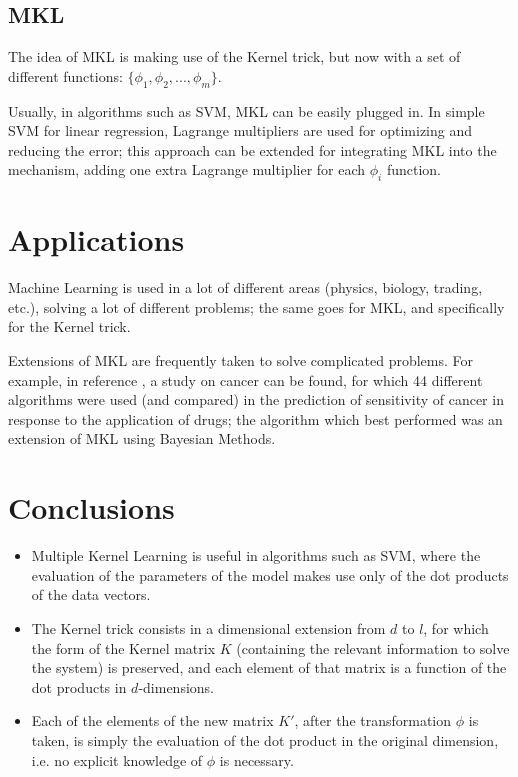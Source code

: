 \documentclass[paper=a4, fontsize=11pt]{scrartcl} %
\numberwithin{equation}{section} %
\numberwithin{figure}{section} %
\numberwithin{table}{section} %
\begin{document}
\subsection{MKL}

The idea of MKL is making use of the Kernel trick, but now with a set of different functions: $\{ \phi_{1}, \phi_{2}, ..., \phi_{m} \}$.

Usually, in algorithms such as SVM, MKL can be easily plugged in. In simple SVM for linear regression, Lagrange multipliers are used for optimizing and reducing the error; this approach can be extended for integrating MKL into the mechanism, adding one extra Lagrange multiplier for each $\phi_{i}$ function.






 



\section{Applications}

Machine Learning is used in a lot of different areas (physics, biology, trading, etc.), solving a lot of different problems; the same goes for MKL, and specifically for the Kernel trick.

Extensions of MKL are frequently taken to solve complicated problems. For example, in reference \cite{cancer_research}, a study on cancer can be found, for which 44 different algorithms were used (and compared) in the prediction of sensitivity of cancer in response to the application of drugs; the algorithm which best performed was an extension of MKL using Bayesian Methods.




\section{Conclusions}

\begin{itemize}
\item Multiple Kernel Learning is useful in algorithms such as SVM, where the evaluation of the parameters of the model makes use only of the dot products of the data vectors.
\item The Kernel trick consists in a dimensional extension from $d$ to $l$, for which the form of the Kernel matrix $K$ (containing the relevant information to solve the system) is preserved, and each element of that matrix is a function of the dot products in $d$-dimensions.
\item Each of the elements of the new matrix $K'$, after the transformation $\phi$ is taken, is simply the evaluation of the dot product in the original dimension, i.e. no explicit knowledge of $\phi$ is necessary.
\end{itemize}
\end{document}
